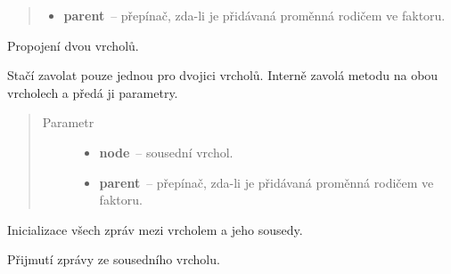 \begin{fulllineitems}
\begin{fulllineitems}
\begin{quote}
\begin{description}
\begin{itemize}
\item {}
\textbf{parent}~-- přepínač, zda-li je přidávaná proměnná rodičem ve faktoru.
\end{itemize}
\end{description}\end{quote}

\end{fulllineitems}


\begin{fulllineitems}
\label{alex.infer:alex.infer.factor.alex.infer.node.DirichletFactorNode.connect}
Propojení dvou vrcholů.


Stačí zavolat pouze jednou pro dvojici vrcholů.
Interně zavolá metodu {\hyperref[alex.infer:alex.infer.factor.alex.infer.node.DirichletFactorNode.add_neighbor]{}} na obou vrcholech a předá ji parametry.

\begin{quote}\begin{description}
\item[{Parametr}] \leavevmode\begin{itemize}
\item {}
\textbf{node}~-- sousední vrchol.

\item {}
\textbf{parent}~-- přepínač, zda-li je přidávaná proměnná rodičem ve faktoru.
\end{itemize}
\end{description}\end{quote}

\end{fulllineitems}


\begin{fulllineitems}
\label{alex.infer:alex.infer.factor.alex.infer.node.DirichletFactorNode.init_messages}
Inicializace všech zpráv mezi vrcholem a jeho sousedy.

\end{fulllineitems}


\begin{fulllineitems}
\label{alex.infer:alex.infer.factor.alex.infer.node.DirichletFactorNode.message_from}
Přijmutí zprávy ze sousedního vrcholu.


\end{fulllineitems}
\end{fulllineitems}
